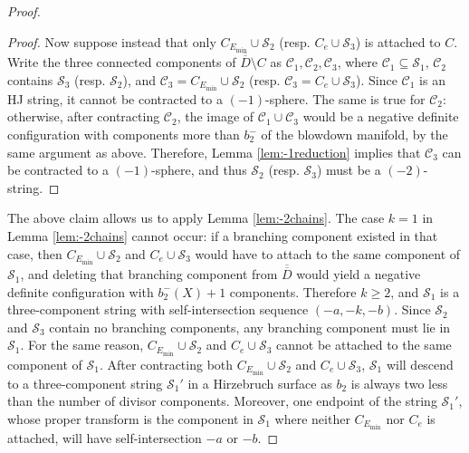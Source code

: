 \documentclass[11pt]{article}
\theoremstyle{definition}
\theoremstyle{remark}
\newcommand{\st}{\mathcal{S}}
\begin{document}
\begin{proof}
\begin{proof}
  Now suppose instead that only $C_{E_{\text{min}}}\cup \st_2$ (resp. $C_e\cup\st_3$) is attached to $C$. Write the three connected components of $\overline{\overline{D}}\setminus C$ as $\mathcal{C}_1,\mathcal{C}_2,\mathcal{C}_3$, where $\mathcal{C}_1\subseteq \st_1$, $\mathcal{C}_2$ contains $\st_3$ (resp. $\st_2$), and $\mathcal{C}_3=C_{E_{\text{min}}}\cup \st_2$ (resp. $\mathcal{C}_3=C_e\cup \st_3$). Since $\mathcal{C}_1$ is an HJ string, it cannot be contracted to a $(-1)$-sphere. The same is true for $\mathcal{C}_2$: otherwise, after contracting $\mathcal{C}_2$, the image of $\mathcal{C}_1\cup\mathcal{C}_3$ would be a negative definite configuration with components more than $b_2^-$ of the blowdown manifold, by the same argument as above. Therefore, Lemma \ref{lem:-1reduction} implies that $\mathcal{C}_3$ can be contracted to a $(-1)$-sphere, and thus $\st_2$ (resp. $\st_3$) must be a $(-2)$-string.
\end{proof}
The above claim allows us to apply Lemma \ref{lem:-2chains}. The case $k=1$ in Lemma \ref{lem:-2chains} cannot occur: if a branching component existed in that case, then $C_{E_{\text{min}}}\cup \st_2$ and $C_e\cup \st_3$ would have to attach to the same component of $\st_1$, and deleting that branching component from $\overline{\overline{D}}$ would yield a negative definite configuration with $b_2^-(X)+1$ components. Therefore $k\geq 2$, and $\st_1$ is a three-component string with self-intersection sequence $(-a,-k,-b)$. Since $\st_2$ and $\st_3$ contain no branching components, any branching component must lie in $\st_1$. For the same reason, $C_{E_{\text{min}}}\cup \st_2$ and $C_e\cup \st_3$ cannot be attached to the same component of $\st_1$.
After contracting both $C_{E_{\text{min}}}\cup \st_2$ and $C_e\cup \st_3$, $\st_1$ will descend to a three-component string $\st_1'$ in a Hirzebruch surface as $b_2$ is always two less than the number of divisor components.
Moreover, one endpoint of the string $\st_1'$, whose proper transform is the component in $\st_1$ where neither $C_{E_{\text{min}}}$ nor $C_e$ is attached, will have self-intersection $-a$ or $-b$.


\end{proof}
\end{document}

